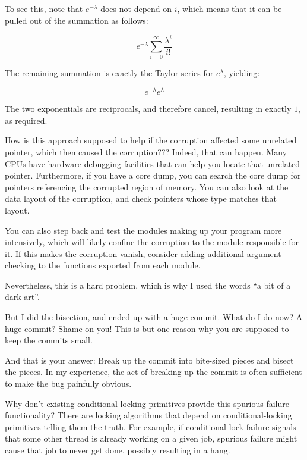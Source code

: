 \begin{enumerate}
	To see this, note that $e^{-\lambda}$ does not depend on $i$,
	which means that it can be pulled out of the summation as follows:

	\begin{equation}
		e^{-\lambda} \sum_{i=0}^\infty \frac{\lambda^i}{i!}
	\end{equation}

	The remaining summation is exactly the Taylor series for
	$e^\lambda$, yielding:

	\begin{equation}
		e^{-\lambda} e^\lambda
	\end{equation}

	The two exponentials are reciprocals, and therefore cancel,
	resulting in exactly $1$, as required.

\QuickQ{}
	How is this approach supposed to help if the corruption affected some
	unrelated pointer, which then caused the corruption???
\QuickA{}
	Indeed, that can happen.
	Many CPUs have hardware-debugging facilities that can help you
	locate that unrelated pointer.
	Furthermore, if you have a core dump, you can search the core
	dump for pointers referencing the corrupted region of memory.
	You can also look at the data layout of the corruption, and
	check pointers whose type matches that layout.

	You can also step back and test the modules making up your
	program more intensively, which will likely confine the corruption
	to the module responsible for it.
	If this makes the corruption vanish, consider adding additional
	argument checking to the functions exported from each module.

	Nevertheless, this is a hard problem, which is why I used the
	words ``a bit of a dark art''.

\QuickQ{}
	But I did the bisection, and ended up with a huge commit.
	What do I do now?
\QuickA{}
	A huge commit?
	Shame on you!
	This is but one reason why you are supposed to keep the commits small.

	And that is your answer: Break up the commit into bite-sized
	pieces and bisect the pieces.
	In my experience, the act of breaking up the commit is often
	sufficient to make the bug painfully obvious.

\QuickQ{}
	Why don't existing conditional-locking primitives provide this
	spurious-failure functionality?
\QuickA{}
	There are locking algorithms that depend on conditional-locking
	primitives telling them the truth.
	For example, if conditional-lock failure signals that
	some other thread is already working on a given job,
	spurious failure might cause that job to never get done,
	possibly resulting in a hang.


\end{enumerate}
